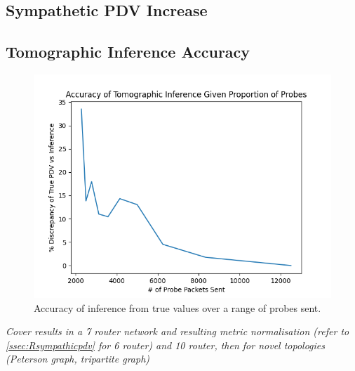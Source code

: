 \subsection*{Sympathetic PDV Increase}
\label{ssec:Rsympathicpdv}

\subsection*{Tomographic Inference Accuracy}
\begin{figure}[H]
        \centering
        \includegraphics[width=\textwidth]{figs/results/Probe_PDV_accuracy_plot.png}
        \caption{Accuracy of inference from true values over a range of probes sent.}
        \label{fig:Rqstabilization}
\end{figure}
\emph{Cover results in a 7 router network and resulting metric normalisation (refer to \cref{ssec:Rsympathicpdv} for 6 router) and 10 router, then for novel topologies (Peterson graph, tripartite graph)}


